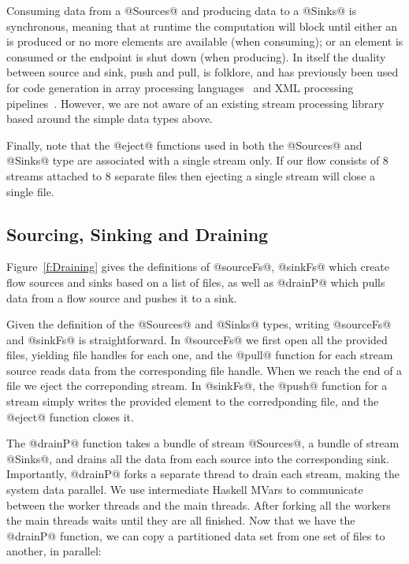 Consuming data from a @Sources@ and producing data to a @Sinks@ is synchronous, meaning that at runtime the computation will block until either an is produced or no more elements are available (when consuming); or an element is consumed or the endpoint is shut down (when producing). In itself the duality between source and sink, push and pull, is folklore, and has previously been used for code generation in array processing languages~\cite{Claessen:ExpressiveArray,Svensson:Defunctionalizing} and XML processing pipelines~\cite{Kay:YouPull}. However, we are not aware of an existing stream processing library based around the simple data types above.

Finally, note that the @eject@ functions used in both the @Sources@ and @Sinks@ type are associated with a single stream only. If our flow consists of 8 streams attached to 8 separate files then ejecting a single stream will close a single file.


\subsection{Sourcing, Sinking and Draining}
Figure~\ref{f:Draining} gives the definitions of @sourceFs@, @sinkFs@ which create flow sources and sinks based on a list of files, as well as @drainP@ which pulls data from a flow source and pushes it to a sink. 

Given the definition of the @Sources@ and @Sinks@ types, writing @sourceFs@ and @sinkFs@ is straightforward. In @sourceFs@ we first open all the provided files, yielding file handles for each one, and the @pull@ function for each stream source reads data from the corresponding file handle. When we reach the end of a file we eject the correponding stream. In @sinkFs@, the @push@ function for a stream simply writes the provided element to the corredponding file, and the @eject@ function closes it.

The @drainP@ function takes a bundle of stream @Sources@, a bundle of stream @Sinks@, and drains all the data from each source into the corresponding sink. Importantly, @drainP@ forks a separate thread to drain each stream, making the system data parallel. We use intermediate Haskell MVars to communicate between the worker threads and the main threads. After forking all the workers the main threads waits until they are all finished. Now that we have the @drainP@ function, we can copy a partitioned data set from one set of files to another, in parallel:

